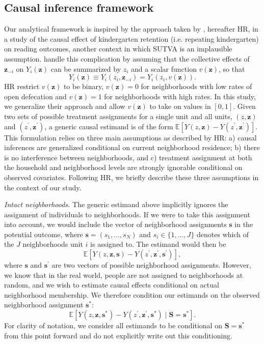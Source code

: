 \documentclass[11pt,a4paper]{article}
\begin{document}
\subsection{Causal inference framework}
Our analytical framework is inspired by the approach taken by \cite{hong_raudenbush}, hereafter HR, in a study of the causal effect of kindergarten retention (i.e. repeating kindergarten) on reading outcomes, another context in which SUTVA is an implausible assumption. \cite{hong_raudenbush} handle this complication by assuming that the collective effects of $\mathbf{z}_{-i}$ on $Y_i(\mathbf{z})$ can be summarized by $z_i$ and a scalar function $v(\mathbf{z})$, so that
\begin{equation}\label{eq:hr_pot_out}
	Y_i(\mathbf{z}) \equiv Y_i(z_i, \mathbf{z}_{-i}) = Y_i(z_i, v(\mathbf{z})).
\end{equation}
HR restrict $v(\mathbf{z})$ to be binary, $v(\mathbf{z}) = 0$ for neighborhoods with low rates of open defecation and $v(\mathbf{z}) = 1$ for neighborhoods with high rates. In this study, we generalize their approach and allow $v(\mathbf{z})$ to take on values in $[0,1]$. Given two sets of possible treatment assignments for a single unit and all units, $(z, \mathbf{z})$ and $(z^{\prime}, \mathbf{z}^{\prime})$, a generic causal estimand is of the form $\mathbb{E}[Y(z, \mathbf{z}) - Y(z^{\prime}, \mathbf{z}^{\prime})]$. This formulation relies on three main assumptions as described by HR: a) causal inferences are generalized conditional on current neighborhood residence; b) there is no interference between neighborhoods, and c) treatment assignment at both the household and neighborhood levels are strongly ignorable conditional on observed covariates. Following HR, we briefly describe these three assumptions in the context of our study.

\textit{Intact neighborhoods.} The generic estimand above implicitly ignores the assignment of individuals to neighborhoods. If we were to take this assignment into account, we would include the vector of neighborhood assignments $\mathbf{s}$ in the potential outcome, where $\mathbf{s} = (s_1, \ldots, s_N)$ and $s_i \in \{1, \ldots, J\}$ denotes which of the $J$ neighborhoods unit $i$ is assigned to. The estimand would then be
\[
	\mathbb{E}[Y(z, \mathbf{z}, \mathbf{s}) - Y(z^{\prime}, \mathbf{z}^{\prime}, \mathbf{s}^{\prime})],
\]
where $\mathbf{s}$ and $\mathbf{s}^{\prime}$ are two vectors of possible neighborhood assignments. However, we know that in the real world, people are not assigned to neighborhoods at random, and we wish to estimate causal effects conditional on actual neighborhood membership. We therefore condition our estimands on the observed neighborhood assignment $\mathbf{s}^*$:
\[
	\mathbb{E}[Y(z, \mathbf{z}, \mathbf{s}^*) - Y(z^{\prime}, \mathbf{z}^{\prime}, \mathbf{s}^*) \mid \mathbf{S} = \mathbf{s}^*].
\]
For clarity of notation, we consider all estimands to be conditional on $\mathbf{S} = \mathbf{s}^*$ from this point forward and do not explicitly write out this conditioning.
\end{document}
